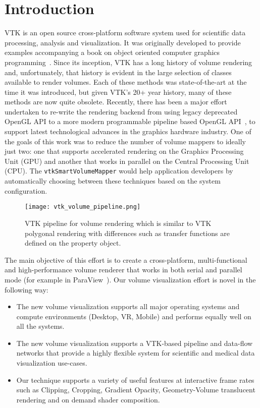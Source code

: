 \section{Introduction}
\label{introduction}
VTK is an open source cross-platform software system used for scientific data
processing, analysis and visualization. It was originally developed to provide
examples accompanying a book on object oriented computer graphics
programming~\citep{schroeder_visualization_2006, geveci_vtk_2012}.  Since its
inception, VTK has a long history of volume rendering and, unfortunately, that
history is evident in the large selection of classes available to render
volumes. Each of these methods was state-of-the-art at the time it was
introduced, but given VTK's 20+ year history, many of these methods are now
quite obsolete. Recently, there has been a major
effort~\citep{hanwell_visualization_2015} undertaken to re-write the rendering
backend from using legacy deprecated OpenGL API to a more modern programmable
pipeline based OpenGL API~\citep{shreiner_opengl_2013}, to support latest
technological advances in the graphics hardware industry. One of the goals of
this work was to reduce the number of volume mappers to ideally just two: one
that supports accelerated rendering on the Graphics Processing Unit (GPU) and
another that works in parallel on the Central Processing Unit (CPU). The
\texttt{vtkSmartVolumeMapper} would help application developers by automatically
choosing between these techniques based on the system configuration.

\begin{figure}[ht]
  \centering
  \texttt{[image: vtk\_volume\_pipeline.png]}
  \caption{VTK pipeline for volume rendering which is similar to VTK polygonal
    rendering with differences such as transfer functions are defined on the
    property object.}
  \label{fig:pipeline}
\end{figure}%

The main objective of this effort is to create a cross-platform,
multi-functional and high-performance volume renderer that works in both serial
and parallel mode (for example in
ParaView~\citep{ahrens_paraview:_2005,ayachit_paraview_2015}). Our volume
visualization effort is novel in the following way:

\begin{itemize}
  \item The new volume visualization supports all major operating
    systems and compute environments (Desktop, VR, Mobile) and performs equally
    well on all the systems.

  \item The new volume visualization supports a VTK-based pipeline and data-flow
    networks that provide a highly flexible system for scientific and medical data
    visualization use-cases.

  \item Our technique supports a variety of useful features at interactive frame
    rates such as Clipping, Cropping, Gradient Opacity, Geometry-Volume translucent
    rendering and on demand shader composition.
\end{itemize}

